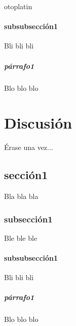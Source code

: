 otoplatin\documentclass[a4paper,openright,12pt]{report}
\begin{document}
\subsubsection{subsubsección1}
Bli bli bli
\paragraph{párrafo1}
Blo blo blo

\chapter{Discusión}\label{cap.discusión}
Érase una vez...
\section{sección1}
Bla bla bla
\subsection{subsección1}
Ble ble ble
\subsubsection{subsubsección1}
Bli bli bli
\paragraph{párrafo1}
Blo blo blo

\end{document}
